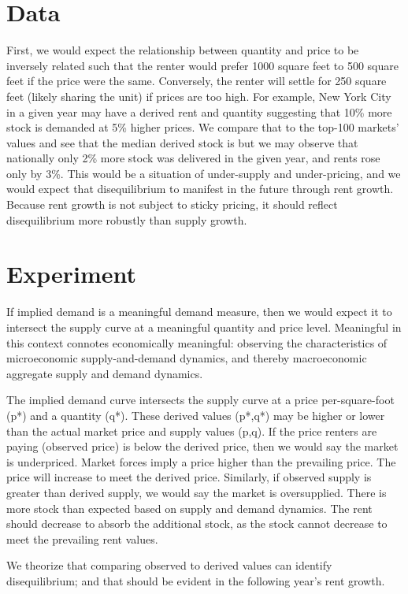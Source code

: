 \documentclass[sn-mathphys-num]{sn-jnl}%
\theoremstyle{thmstyleone}%
\theoremstyle{thmstyletwo}%
\theoremstyle{thmstylethree}%
\begin{document}
\section{Data}\label{sec2}
First, we would expect the relationship between quantity and price to be inversely related such that the renter would prefer 1000 square feet to 500 square feet if the price were the same. Conversely,  the renter will settle for 250 square feet (likely sharing the unit) if prices are too high. 
For example, New York City in a given year may have a derived rent and quantity suggesting that 10\% more stock is demanded at 5\% higher prices. We compare that to the top-100 markets' values and see that the median derived stock is  but we may observe that nationally only 2\% more stock was delivered in the given year, and rents rose only by 3\%. This would be a situation of under-supply and under-pricing, and we would expect that disequilibrium to manifest in the future through rent growth. Because rent growth is not subject to sticky pricing, it should reflect disequilibrium more robustly than supply growth.
\section{Experiment}\label{sec2}

If implied demand is a meaningful demand measure, then we would expect it to intersect the supply curve at a meaningful quantity and price level. Meaningful in this context connotes economically meaningful: observing the characteristics of microeconomic supply-and-demand dynamics, and thereby macroeconomic aggregate supply and demand dynamics. 

The implied demand curve intersects the supply curve at a price per-square-foot (p*) and a quantity (q*). These derived values (p*,q*) may be higher or lower than the actual market price and supply values (p,q).
If the price renters are paying (observed price) is below the derived price, then we would say the market is underpriced. Market forces imply a price higher than the prevailing price. The price will increase to meet the derived price. 
Similarly, if observed supply is greater than derived supply, we would say the market is oversupplied. There is more stock than expected based on supply and demand dynamics. The rent should decrease to absorb the additional stock, as the stock cannot decrease to meet the prevailing rent values. 

We theorize that comparing observed to derived values can identify disequilibrium; and that should be evident in the following year's rent growth. 
\end{document}
